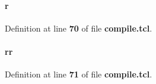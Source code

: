 \paragraph[{r}]{\setlength{\rightskip}{0pt plus 5cm}r}\label{tx__path__top_2tx__path_2compile_8tcl_a514f1b439f404f86f77090fa9edc96ce}


Definition at line {\bf 70} of file {\bf compile.\+tcl}.

\paragraph[{rr}]{\setlength{\rightskip}{0pt plus 5cm}rr}\label{tx__path__top_2tx__path_2compile_8tcl_aeb9279982226a42afdf2860dbdc29b45}


Definition at line {\bf 71} of file {\bf compile.\+tcl}.

